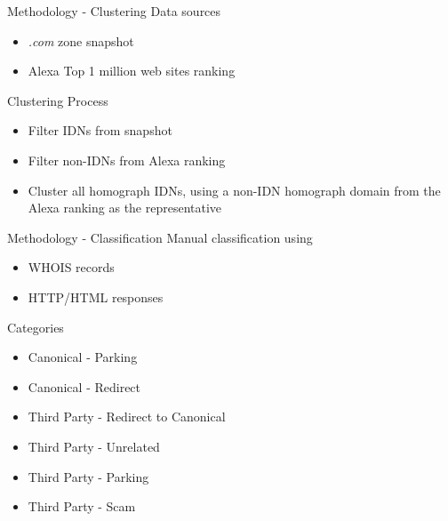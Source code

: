\documentclass[usepdftitle=false]{beamer}
\begin{document}
\begin{frame}{Methodology - Clustering}
Data sources
\begin{itemize}
  \item \textit{.com} zone snapshot
  \item Alexa Top 1 million web sites ranking
\end{itemize}
Clustering Process
\begin{itemize}
  \item Filter IDNs from snapshot
  \item Filter non-IDNs from Alexa ranking
  \item Cluster all homograph IDNs, using a non-IDN homograph domain from the Alexa ranking as the representative
\end{itemize}
\end{frame}

\begin{frame}{Methodology - Classification}
Manual classification using
\begin{itemize}
  \item WHOIS records
  \item HTTP/HTML responses
\end{itemize}
Categories
\begin{itemize}
  \item Canonical - Parking
  \item Canonical - Redirect
  \item Third Party - Redirect to Canonical
  \item Third Party - Unrelated
  \item Third Party - Parking
  \item Third Party - Scam
\end{itemize}
\end{frame}
\end{document}
